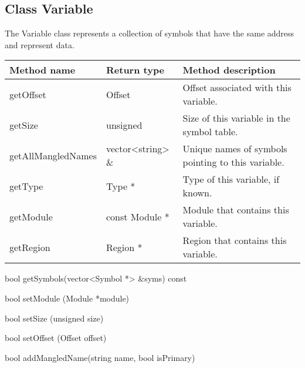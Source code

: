 \subsection{Class Variable}

The Variable class represents a collection of symbols that have the same address and represent data. 

\begin{tabular}{|p{1.25in}|p{1.125in}|p{3.125in}|}
	\hline
	Method name & Return type & Method description \\
	\hline
	getOffset & Offset & Offset associated with this variable. \\
	getSize & unsigned & Size of this variable in the symbol table. \\
	getAllMangledNames & vector<string> \& & Unique names of symbols pointing to this variable. \\
	getType & Type * & Type of this variable, if known. \\
	getModule & const Module * & Module that contains this variable. \\
	getRegion & Region * & Region that contains this variable. \\
	\hline
\end{tabular}

\begin{apient}
bool getSymbols(vector<Symbol *> &syms) const
\end{apient}

\begin{apient}
bool setModule (Module *module)
\end{apient}

\begin{apient}
bool setSize (unsigned size)
\end{apient}

\begin{apient}
bool setOffset (Offset offset)
\end{apient}

\begin{apient}
bool addMangledName(string name, bool isPrimary)
\end{apient}

